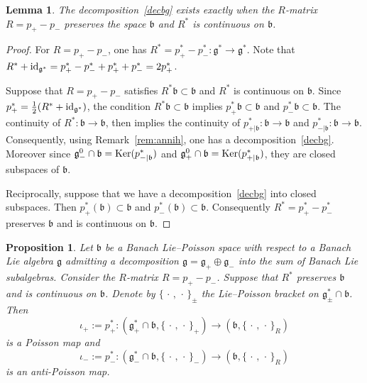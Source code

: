\documentclass[a4paper,12pt,reqno]{amsart}%
\newtheorem{proposition}[theorem]{Proposition}
\newtheorem{lemma}[theorem]{Lemma}
\theoremstyle{definition}
\theoremstyle{remark}
\numberwithin{theorem}{section}
\numberwithin{equation}{section}
\newcommand{\1}{{\bf 1}}
\newcommand{\id}{{\rm id}}
\newcommand{\pb}{\{\,\cdot\,,\,\cdot\,\}}
\DeclareMathOperator{\Ker}{\textnormal{Ker}}
\newcommand{\g}{{\mathfrak g}}
\newcommand{\bg}{{\mathfrak b}}
\begin{document}
\begin{lemma}
  The decomposition~\eqref{decbg} exists exactly when the $R$-matrix $R = p_+-p_-$ preserves the space $\bg$ and $R^*$ is continuous on $\bg$.
\end{lemma}

\begin{proof}
    For $R = p_+-p_-$, one has $R^* = p_+^* - p_-^*:\g^*\rightarrow \g^*$. Note that $R^* + \id_{\g^*} = p_+^* - p_-^* + p_+^* + p_-^* = 2 p^*_+$. 

    Suppose that $R = p_+-p_-$ satisfies $R^*\bg\subset \bg$ and $R^*$ is continuous on $\bg$. 
    Since $p_+^* =\frac{1}{2}(R^* + \id_{\g^*})$, the condition $R^*\bg \subset \bg$ implies  $p_+^*\bg \subset \bg$ and $p^*_-\bg \subset\bg$. The continuity of $R^*:\bg \rightarrow \bg$, then implies the continuity of 
    $p_{+|\bg}^*:\bg\rightarrow \bg$ and $p_{-|\bg}^*:\bg\rightarrow \bg$.
    Consequently, using Remark~\ref{rem:annih}, one has a decomposition~\eqref{decbg}.
    Moreover since $\g_-^0\cap\bg =  \Ker(p_{-|\bg}^*)$ and $\g_+^0\cap\bg  = \Ker(p_{+|\bg}^*)$, they are closed subspaces of $\bg$.
    
    Reciprocally, suppose that we have a decomposition~\eqref{decbg} into closed subspaces. Then $p^*_+(\bg) \subset \bg$ and $p^*_-(\bg)\subset \bg$. Consequently $R^* = p^*_+-p^*_-$ preserves $\bg$ and is continuous on $\bg$.  
\end{proof}

\begin{proposition}\label{proppoisson}
    Let $\bg$ be a Banach Lie--Poisson space with respect to a Banach Lie algebra $\g$ admitting a decomposition
     $\g = \g_+\oplus \g_-$ into the sum of Banach Lie subalgebras. Consider the $R$-matrix $R = p_+ - p_-$. Suppose that $R^*$
     preserves $\bg$ and is continuous on $\bg$. 
     Denote by $\pb_\pm$ the Lie--Poisson bracket on $\g_\pm^*\cap\bg$. Then
\[
\iota_+:= p_+^*: \left(\g_+^*\cap\bg, \pb_+\right) \rightarrow \left(\bg, \pb_R\right)
\]
is a Poisson map and 
\[
\iota_-:= p_-^*: \left(\g_-^*\cap\bg, \pb_-\right) \rightarrow \left(\bg, \pb_R\right)
\]
is an anti-Poisson map.
     \end{proposition}
\end{document}
